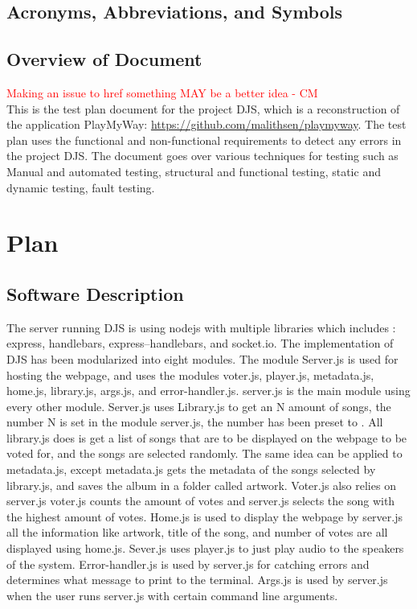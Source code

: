 \documentclass[12pt, titlepage]{article}
\begin{document}
\subsection{Acronyms, Abbreviations, and Symbols}

\subsection{Overview of Document}
\textcolor{red}{Making an issue to href something MAY be a better idea - CM} \\
This is the test plan document for the project DJS, which is a reconstruction of the application PlayMyWay: \url{https://github.com/malithsen/playmyway}.
The test plan uses the functional and non-functional requirements to detect any errors in the project DJS.
The document goes over various techniques for testing such as Manual and automated testing, structural and
functional testing, static and dynamic testing, fault testing.

\section{Plan}
	
\subsection{Software Description}
The server running DJS is using nodejs with multiple libraries which includes : express, handlebars, express--handlebars, and socket.io. The implementation of DJS has been modularized into eight modules. The module Server.js is used for hosting the webpage, and uses the modules voter.js, player.js, metadata.js, home.js, library.js, args.js, and error-handler.js. server.js is the main module using every other module. Server.js uses Library.js to get an N amount of songs, the number N is set in the module server.js, the number has been preset to \numberOfSongs. All library.js does is get a list of songs that are to be displayed on the webpage to be voted for, and the songs are selected randomly. The same idea can be applied to metadata.js, except metadata.js gets the metadata of the songs selected by library.js, and saves the album in a folder called artwork. Voter.js also relies on server.js voter.js counts the amount of votes and server.js selects the song with the highest amount of votes. Home.js is used to display the webpage by server.js all the information like artwork, title of the song, and number of votes are all displayed using home.js. Sever.js uses player.js to just play audio to the speakers of the system. Error-handler.js is used by server.js for catching errors and determines what message to print to the terminal. Args.js is used by server.js when the user runs server.js with certain command line arguments.
\end{document}
